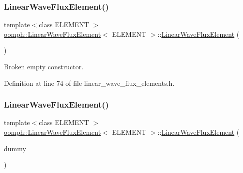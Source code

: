 \subsubsection{\texorpdfstring{Linear\+Wave\+Flux\+Element()}{LinearWaveFluxElement()}\hspace{0.1cm}{\footnotesize\ttfamily [2/3]}}
{\footnotesize\ttfamily template$<$class E\+L\+E\+M\+E\+NT $>$ \\
\hyperlink{classoomph_1_1LinearWaveFluxElement}{oomph\+::\+Linear\+Wave\+Flux\+Element}$<$ E\+L\+E\+M\+E\+NT $>$\+::\hyperlink{classoomph_1_1LinearWaveFluxElement}{Linear\+Wave\+Flux\+Element} (\begin{DoxyParamCaption}{ }\end{DoxyParamCaption})\hspace{0.3cm}{\ttfamily [inline]}}



Broken empty constructor. 



Definition at line 74 of file linear\+\_\+wave\+\_\+flux\+\_\+elements.\+h.

\mbox{\label{classoomph_1_1LinearWaveFluxElement_ad691eb5035646eb94520bb79103928d9}} 
\subsubsection{\texorpdfstring{Linear\+Wave\+Flux\+Element()}{LinearWaveFluxElement()}\hspace{0.1cm}{\footnotesize\ttfamily [3/3]}}
{\footnotesize\ttfamily template$<$class E\+L\+E\+M\+E\+NT $>$ \\
\hyperlink{classoomph_1_1LinearWaveFluxElement}{oomph\+::\+Linear\+Wave\+Flux\+Element}$<$ E\+L\+E\+M\+E\+NT $>$\+::\hyperlink{classoomph_1_1LinearWaveFluxElement}{Linear\+Wave\+Flux\+Element} (\begin{DoxyParamCaption}\item[{const \hyperlink{classoomph_1_1LinearWaveFluxElement}{Linear\+Wave\+Flux\+Element}$<$ E\+L\+E\+M\+E\+NT $>$ \&}]{dummy }\end{DoxyParamCaption})\hspace{0.3cm}{\ttfamily [inline]}}



